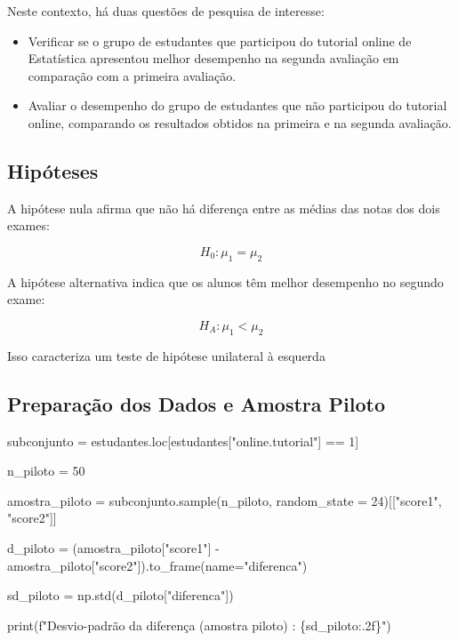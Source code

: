 \documentclass[
  letterpaper,
  DIV=11,
  numbers=noendperiod]{scrreprt}
\newenvironment{Shaded}{\begin{snugshade}}{\end{snugshade}}
\newcommand{\BuiltInTok}[1]{\textcolor[rgb]{0.00,0.23,0.31}{#1}}
\newcommand{\DecValTok}[1]{\textcolor[rgb]{0.68,0.00,0.00}{#1}}
\newcommand{\NormalTok}[1]{\textcolor[rgb]{0.00,0.23,0.31}{#1}}
\newcommand{\OperatorTok}[1]{\textcolor[rgb]{0.37,0.37,0.37}{#1}}
\newcommand{\SpecialCharTok}[1]{\textcolor[rgb]{0.37,0.37,0.37}{#1}}
\newcommand{\SpecialStringTok}[1]{\textcolor[rgb]{0.13,0.47,0.30}{#1}}
\newcommand{\StringTok}[1]{\textcolor[rgb]{0.13,0.47,0.30}{#1}}
\begin{document}
Neste contexto, há duas questões de pesquisa de interesse:

\begin{itemize}
\item
  Verificar se o grupo de estudantes que participou do tutorial online
  de Estatística apresentou melhor desempenho na segunda avaliação em
  comparação com a primeira avaliação.
\item
  Avaliar o desempenho do grupo de estudantes que não participou do
  tutorial online, comparando os resultados obtidos na primeira e na
  segunda avaliação.
\end{itemize}

\subsection{Hipóteses}\label{hipuxf3teses-1}

A hipótese nula afirma que não há diferença entre as médias das notas
dos dois exames:

\[H_0: \mu_1 = \mu_2\]

A hipótese alternativa indica que os alunos têm melhor desempenho no
segundo exame:

\[H_A: \mu_1 < \mu_2\]

Isso caracteriza um teste de hipótese unilateral à esquerda

\subsection{Preparação dos Dados e Amostra
Piloto}\label{preparauxe7uxe3o-dos-dados-e-amostra-piloto}

\begin{Shaded}
\begin{Highlighting}[]
\NormalTok{subconjunto }\OperatorTok{=}\NormalTok{ estudantes.loc[estudantes[}\StringTok{"online.tutorial"}\NormalTok{] }\OperatorTok{==} \DecValTok{1}\NormalTok{]}

\NormalTok{n\_piloto }\OperatorTok{=} \DecValTok{50}

\NormalTok{amostra\_piloto }\OperatorTok{=}\NormalTok{ subconjunto.sample(n\_piloto, random\_state }\OperatorTok{=} \DecValTok{24}\NormalTok{)[[}\StringTok{"score1"}\NormalTok{, }\StringTok{"score2"}\NormalTok{]]}

\NormalTok{d\_piloto }\OperatorTok{=}\NormalTok{ (amostra\_piloto[}\StringTok{"score1"}\NormalTok{] }\OperatorTok{{-}}\NormalTok{ amostra\_piloto[}\StringTok{"score2"}\NormalTok{]).to\_frame(name}\OperatorTok{=}\StringTok{"diferenca"}\NormalTok{)}

\NormalTok{sd\_piloto }\OperatorTok{=}\NormalTok{ np.std(d\_piloto[}\StringTok{"diferenca"}\NormalTok{])}

\BuiltInTok{print}\NormalTok{(}\SpecialStringTok{f"Desvio{-}padrão da diferença (amostra piloto) : }\SpecialCharTok{\{}\NormalTok{sd\_piloto}\SpecialCharTok{:.2f\}}\SpecialStringTok{"}\NormalTok{)}
\end{Highlighting}
\end{Shaded}
\end{document}
